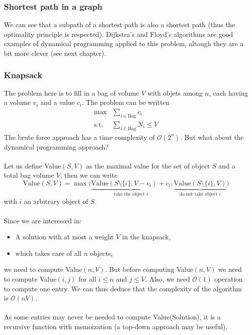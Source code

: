 \subsubsection{Shortest path in a graph}

We can see that a subpath of a shortest path is also a shortest path (thus the optimality principle is respected). Dijkstra's and Floyd's algorithms are good examples of dynamical programming applied to this problem, altough they are a bit more clever (see next chapter).

\subsubsection{Knapsack}

The problem here is to fill in a bag of volume $V$ with objets among $n$, each having a volume $v_i$ and a value $c_i$. The problem can be written
\begin{align*}
\max & \sum_{i \in \text{Bag}} c_i  \\
\text{s.t.} & \sum_{i \in \text{Bag}} N_i \leq V
\end{align*}
The brute force approach has a time complexity of $\mathcal{O}(2^n)$. But what about the dynamical programming approach?
\\ \\
Let us define Value$(S,V)$ as the maximal value for the set of object $S$ and a total bag volume $V$, then we can write
\[
\text{Value}(S,V) = \max \big(\underbrace{\text{Value}(S \setminus \{i\}, V-v_i)+c_i}_{\text{take the object }i} ; \underbrace{\text{Value}(S \setminus \{i\},V)}_{\text{do not take object }i}\big)
\]
with $i$ an arbitrary object of $S$.
\\ \\
Since we are interessed in:
\begin{itemize}
\item A solution with at most a weight $V$ in the knapsack,
\item which takes care of all $n$ objects,
\end{itemize}
we need to compute Value$(n,V)$. But before computing Value$(n,V)$ we need to compute Value$(i,j)$ for all $i \leq n$ and $j \leq V$. Also, we need $\mathcal{O}(1)$ operation to compute one entry. We can thus deduce that the complexity of the algorithm is $\mathcal{O}(nV)$.
\\ \\
As some entries may never be needed to compute Value(Solution), it is a recursive function with memoization (a top-down approach may be useful).

